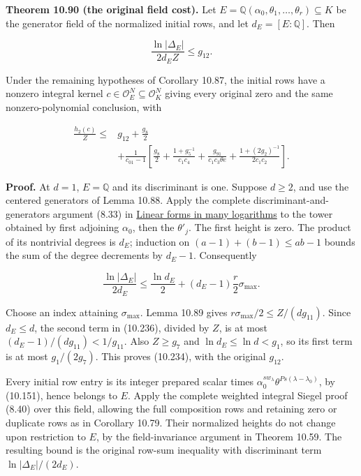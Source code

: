 \documentclass[
  11pt,
  a4paper,
]{article}
\begin{document}
\textbf{Theorem 10.90 (the original field cost).} Let
\(E=\mathbb Q(\alpha_0,\theta_1,\ldots,\theta_r)\subseteq K\) be the
generator field of the normalized initial rows, and let
\(d_E=[E:\mathbb Q]\). Then

\[
\frac{\ln|\Delta_E|}{2d_EZ}\le g_{12}.
\tag{10.234}
\]

Under the remaining hypotheses of Corollary 10.87, the initial rows have
a nonzero integral kernel \(c\in\mathcal O_E^N\subseteq\mathcal O_K^N\)
giving every original zero and the same nonzero-polynomial conclusion,
with

\[
\begin{aligned}
\frac{h_2(c)}Z\le{}&
g_{12}+\frac{g_8}{2}\\
&+\frac1{c_{01}-1}\left[
\frac{g_8}{2}
+\frac{1+g_5^{-1}}{c_1c_4}
+\frac{g_{91}}{c_1c_3\theta e}
+\frac{1+(2g_2)^{-1}}{2c_1c_2}\right].
\end{aligned}
\tag{10.235}
\]

\textbf{Proof.} At \(d=1\), \(E=\mathbb Q\) and its discriminant is one.
Suppose \(d\ge2\), and use the centered generators of Lemma 10.88. Apply
the complete discriminant-and-generators argument (8.33) in
\href{../TR-BAKER-08.html\#the-discriminant-of-the-coefficient-field}{Linear
forms in many logarithms} to the tower obtained by first adjoining
\(\alpha_0\), then the \(\theta'_j\). The first height is zero. The
product of its nontrivial degrees is \(d_E\); induction on
\((a-1)+(b-1)\le ab-1\) bounds the sum of the degree decrements by
\(d_E-1\). Consequently

\[
\frac{\ln|\Delta_E|}{2d_E}
\le\frac{\ln d_E}{2}
+(d_E-1)\frac r2\sigma_{\max}.
\tag{10.236}
\]

Choose an index attaining \(\sigma_{\max}\). Lemma 10.89 gives
\(r\sigma_{\max}/2\le Z/(dg_{11})\). Since \(d_E\le d\), the second term
in (10.236), divided by \(Z\), is at most
\((d_E-1)/(dg_{11})<1/g_{11}\). Also \(Z\ge g_7\) and
\(\ln d_E\le\ln d<g_1\), so its first term is at most \(g_1/(2g_7)\).
This proves (10.234), with the original \(g_{12}\).

Every initial row entry is its integer prepared scalar times
\(\alpha_0^{sw_\lambda}\theta^{Ps(\lambda-\lambda_0)}\), by (10.151),
hence belongs to \(E\). Apply the complete weighted integral Siegel
proof (8.40) over this field, allowing the full composition rows and
retaining zero or duplicate rows as in Corollary 10.79. Their normalized
heights do not change upon restriction to \(E\), by the field-invariance
argument in Theorem 10.59. The resulting bound is the original row-sum
inequality with discriminant term \(\ln|\Delta_E|/(2d_E)\).
\end{document}
